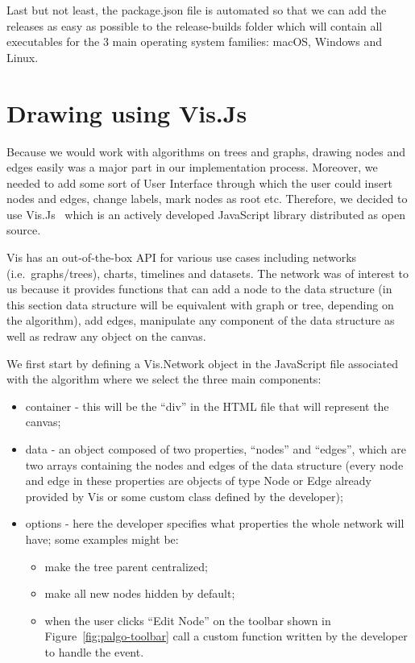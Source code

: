 \documentclass{l4proj}
\begin{document}
Last but not least, the package.json file is automated so that we can add the releases as easy as possible to the
release-builds folder which will contain all executables for the 3 main operating system families: macOS, Windows and
Linux.

\section{Drawing using Vis.Js}

Because we would work with algorithms on trees and graphs, drawing nodes and edges easily was a major part in our
implementation process. Moreover, we needed to add some sort of User Interface through which the user could insert
nodes and edges, change labels, mark nodes as root etc. Therefore, we decided to use Vis.Js~\cite{visjs} which is an
actively developed JavaScript library distributed as open source.

Vis has an out-of-the-box API for various use cases including networks (i.e.\ graphs/trees), charts,
timelines and datasets. The network was of interest to us because it provides functions that can add a node to the
data structure (in this section data structure will be equivalent with graph or tree, depending on the algorithm), add
edges, manipulate any component of the data structure as well as redraw any object on the canvas. 

We first start by defining a Vis.Network object in the JavaScript file associated with the algorithm where we select
the three main components:

\begin{itemize}
  \item container - this will be the ``div'' in the HTML file that will represent the canvas;
  \item data - an object composed of two properties, ``nodes'' and ``edges'', which are two arrays containing the
    nodes and edges of the data structure (every node and edge in these properties are objects of type Node or Edge
    already provided by Vis or some custom class defined by the developer);
  \item options - here the developer specifies what properties the whole network will have; some examples might be:
    \begin{itemize}
      \item make the tree parent centralized;
      \item make all new nodes hidden by default;
      \item when the user clicks ``Edit Node'' on the toolbar shown in Figure~\ref{fig:palgo-toolbar} call a custom
	function written by the developer to handle the event.
    \end{itemize}
\end{itemize}
\end{document}
